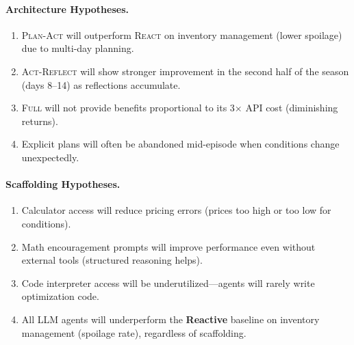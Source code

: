 \paragraph{Architecture Hypotheses.}
\begin{enumerate}[label=\textbf{H\arabic*}:,resume]
    \item \textsc{Plan-Act} will outperform \textsc{React} on inventory management (lower spoilage) due to multi-day planning.
    \item \textsc{Act-Reflect} will show stronger improvement in the second half of the season (days 8--14) as reflections accumulate.
    \item \textsc{Full} will not provide benefits proportional to its 3$\times$ API cost (diminishing returns).
    \item Explicit plans will often be abandoned mid-episode when conditions change unexpectedly.
\end{enumerate}

\paragraph{Scaffolding Hypotheses.}
\begin{enumerate}[label=\textbf{H\arabic*}:,resume]
    \item Calculator access will reduce pricing errors (prices too high or too low for conditions).
    \item Math encouragement prompts will improve performance even without external tools (structured reasoning helps).
    \item Code interpreter access will be underutilized---agents will rarely write optimization code.
    \item All LLM agents will underperform the \textbf{Reactive} baseline on inventory management (spoilage rate), regardless of scaffolding.
\end{enumerate}
